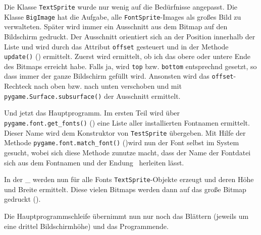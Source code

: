 Die Klasse \texttt{TextSprite} wurde nur wenig auf die Bedürfnisse angepasst. Die Klasse \texttt{BigImage} hat  die Aufgabe, alle \texttt{FontSprite}-Images als großes Bild zu verwalteten. Später wird immer ein Ausschnitt aus dem Bitmap auf den Bildschirm gedruckt. Der Ausschnitt orientiert sich an der Position innerhalb der Liste und wird durch das Attribut \texttt{offset} gesteuert und in der Methode \texttt{update()} () ermittelt. Zuerst wird ermittelt, ob ich das obere oder untere Ende des Bitmaps erreicht habe. Falls ja, wird \texttt{top} bzw. \texttt{bottom} entsprechnd gesetzt, so dass immer der ganze Bildschirm gefüllt wird. Ansonsten wird das \texttt{offset}-Rechteck nach oben bzw. nach unten verschoben und mit \texttt{pygame.Surface.subsurface()} der Ausschnitt ermittelt.


Und jetzt das Hauptprogramm. Im ersten Teil wird über \texttt{pygame.font.get\_fonts()} () eine Liste aller installierten Fontnamen ermittelt. Dieser Name wird dem Konstruktor von \texttt{TestSprite} übergeben. Mit Hilfe der Methode \texttt{pygame.font.match\_font()} ()wird nun der Font selbst im System gesucht, wobei sich diese Methode zunutze macht, dass der Name der Fontdatei sich aus dem Fontnamen und der Endung~ herleiten lässt.

\newpage
{} 

In der \forSchleife\_ werden nun für alle Fonts \texttt{TextSprite}-Objekte erzeugt und deren Höhe und Breite ermittelt. Diese vielen Bitmaps werden dann auf das große Bitmap gedruckt ().


Die Hauptprogrammschleife übernimmt nun nur noch das Blättern (jeweils um eine drittel Bildschirmhöhe) und das Programmende.

